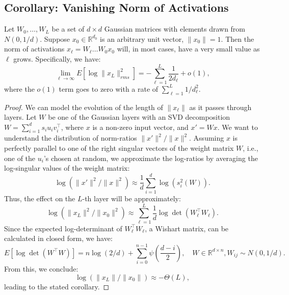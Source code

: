 \subsection{Corollary: Vanishing Norm of Activations}

\begin{corollary}
Let \( W_0, \dots, W_L \) be a set of \( d \times d \) Gaussian matrices with elements drawn from \( N(0, 1/d) \). Suppose \( x_0 \in \mathbb{R}^{d_0} \) is an arbitrary unit vector, \( \|x_0\| = 1 \). Then the norm of activations \( x_\ell = W_\ell \dots W_0 x_0 \) will, in most cases, have a very small value as \( \ell \) grows. Specifically, we have:
\begin{equation}
\lim_{\ell\to\infty} E \left[\log \|x_L\|_{rms}^2\right] = -\sum_{\ell=1}^L \frac{1}{2d_\ell} + o(1),
\end{equation}
where the \( o(1) \) term goes to zero with a rate of \( \sum_{\ell=1}^L 1/d_\ell^2 \).
\end{corollary}

\begin{proof}
We can model the evolution of the length of \( \|x_\ell\| \) as it passes through layers. Let \( W \) be one of the Gaussian layers with an SVD decomposition \( W = \sum_{i=1}^d s_i u_i v_i^\top \), where \( x \) is a non-zero input vector, and \( x' = W x \). We want to understand the distribution of norm-ratios \( \|x'\|^2/\|x\|^2 \). Assuming \( x \) is perfectly parallel to one of the right singular vectors of the weight matrix \( W \), i.e., one of the \( u_i \)'s chosen at random, we approximate the log-ratios by averaging the log-singular values of the weight matrix:
\begin{equation}
\log (\|x'\|^2/\|x\|^2) \approx \frac{1}{d} \sum_{i=1}^d \log(s_i^2(W)).
\end{equation}
Thus, the effect on the \( L \)-th layer will be approximately:
\begin{equation}
\log(\|x_L\|^2/\|x_0\|^2) \approx \sum_{\ell=1}^L \frac{1}{d} \log \det(W_\ell^\top W_\ell).
\end{equation}
Since the expected log-determinant of \( W_\ell^\top W_\ell \), a Wishart matrix, can be calculated in closed form, we have:
\begin{equation}
E\left[\log \det(W^\top W)\right] = n \log(2/d) + \sum_{i=0}^{n-1} \psi\left(\frac{d-i}{2}\right), \quad W \in \mathbb{R}^{d \times n}, W_{ij} \sim N(0, 1/d).
\end{equation}
From this, we conclude:
\begin{equation}
\log(\|x_L\|/\|x_0\|) \approx -\Theta(L),
\end{equation}
leading to the stated corollary.
\end{proof}

